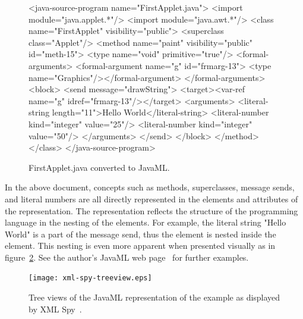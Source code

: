 \documentclass{article}
\begin{document}
\begin{multicols}{2}
\begin{figure}[p]
\begin{listing}{1}
<java-source-program name="FirstApplet.java">
  <import module="java.applet.*"/>
  <import module="java.awt.*"/>
  <class name="FirstApplet" visibility="public">
    <superclass class="Applet"/>
    <method name="paint" visibility="public" id="meth-15">
      <type name="void" primitive="true"/>
      <formal-arguments>
         <formal-argument name="g" id="frmarg-13">
             <type name="Graphics"/></formal-argument>
      </formal-arguments>
      <block>
        <send message="drawString">
          <target><var-ref name="g" idref="frmarg-13"/></target>
            <arguments>
              <literal-string length="11">Hello World</literal-string>
              <literal-number kind="integer" value="25"/>
              <literal-number kind="integer" value="50"/>
            </arguments>
        </send>
      </block>
    </method>
  </class>
</java-source-program>
\end{listing}
\caption{FirstApplet.java converted to JavaML.
\label{fig-firstapplet-javaml}}
\end{figure}

In the above document, concepts such as methods, superclasses, message
sends, and literal numbers are all directly represented in the elements
and attributes of the representation.  The representation reflects the
structure of the programming language in the nesting of the elements.
For example, the literal string "Hello World" is a part of the message
send, thus the  element is nested inside the
 element.  This nesting is even more apparent when
presented visually as in figure~\ref{fig-treeview}. See
 the author's JavaML web page~\cite{Badros-javaml}
for further examples.

\begin{figure}[p]
\begin{centering}
\texttt{[image: xml-spy-treeview.eps]}
\caption{Tree views of the JavaML representation 
of the  example as displayed by XML Spy~\cite{XMLSpy}.
\label{fig-treeview}}
\end{centering}
\end{figure}


\end{multicols}
\end{document}
